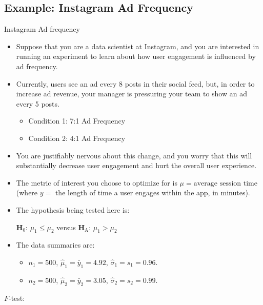 \subsection{Example: Instagram Ad Frequency}
\begin{Example}{Instagram Ad frequency}{}
    \begin{itemize}
        \item Suppose that you are a data scientist at Instagram, and you are interested
              in running an experiment to learn about how user engagement is influenced by ad frequency.
        \item Currently, users see an ad every 8 posts in their social feed, but, in order
              to increase ad revenue, your manager is pressuring your team to show an ad every 5 posts.
              \begin{itemize}
                  \item Condition 1: 7:1 Ad Frequency
                  \item Condition 2: 4:1 Ad Frequency
              \end{itemize}
        \item You are justifiably nervous about this change, and you worry that this
              will substantially decrease user engagement and hurt the overall user experience.
        \item The metric of interest you choose to optimize for is $ \mu=\text{average session time} $
              (where $ y =$ the length of time a user engages within the app, in minutes).
        \item The hypothesis being tested here is:
              \begin{tightcenter}
                  $ \mathbf{H}_0 $: $ \mu_1\le \mu_2 $ versus $ \mathbf{H}_\text{A} $: $ \mu_1>\mu_2 $
              \end{tightcenter}
        \item The data summaries are:
              \begin{itemize}
                  \item $ n_1=500 $, $ \hat{\mu}_1=\bar{y}_1=4.92 $, $ \hat{\sigma}_1=s_1=0.96 $.
                  \item $ n_2=500 $, $ \hat{\mu}_2=\bar{y}_2=3.05 $, $ \hat{\sigma}_2=s_2=0.99 $.
              \end{itemize}
    \end{itemize}
    \begin{framed}
        $ F $-test:
        \begin{itemize}

\end{itemize}
\end{framed}
\end{Example}
